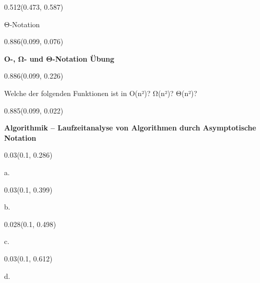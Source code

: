 \documentclass[aspectratio=169]{beamer}
\begin{document}
\begin{frame}[fragile]
\begin{textblock}{0.512}(0.473, 0.587)
  \begin{minipage}[t][0.064\paperheight]{\linewidth}
    {\tiny Θ-Notation}
  \end{minipage}
\end{textblock}
\begin{textblock}{0.886}(0.099, 0.076)
  \begin{minipage}[t][0.131\paperheight]{\linewidth}
    \textbf{O-, Ω- und Θ-Notation Übung}
  \end{minipage}
\end{textblock}
\begin{textblock}{0.886}(0.099, 0.226)
  \begin{minipage}[t][0.63\paperheight]{\linewidth}
    {\small Welche der folgenden Funktionen ist in O(n²)? Ω(n²)? Θ(n²)?}
  \end{minipage}
\end{textblock}
\begin{textblock}{0.885}(0.099, 0.022)
  \begin{minipage}[b][0.031\paperheight]{\linewidth}
    \fontsize{3}{3.3}\selectfont
    \textbf{Algorithmik – Laufzeitanalyse von Algorithmen durch Asymptotische Notation}
  \end{minipage}
\end{textblock}
\begin{textblock}{0.03}(0.1, 0.286)
  \begin{minipage}[t][0.054\paperheight]{\linewidth}
    {\tiny a.}
  \end{minipage}
\end{textblock}
\begin{textblock}{0.03}(0.1, 0.399)
  \begin{minipage}[t][0.054\paperheight]{\linewidth}
    {\tiny b.}
  \end{minipage}
\end{textblock}
\begin{textblock}{0.028}(0.1, 0.498)
  \begin{minipage}[t][0.054\paperheight]{\linewidth}
    {\tiny c.}
  \end{minipage}
\end{textblock}
\begin{textblock}{0.03}(0.1, 0.612)
  \begin{minipage}[t][0.054\paperheight]{\linewidth}
    {\tiny d.}
  \end{minipage}

\end{textblock}
\end{frame}
\end{document}
